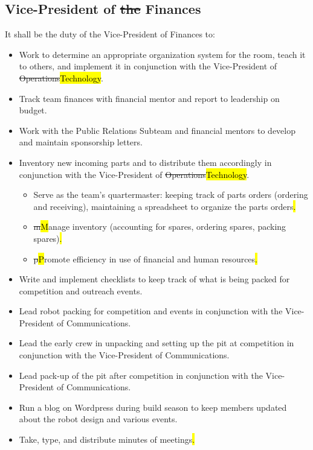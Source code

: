 \documentclass[12pt, a4paper]{article}
\begin{document}
\subsection{Vice-President of \st{the} Finances}
It shall be the duty of the Vice-President of Finances to:
\begin{itemize}
\item Work to determine an appropriate organization system for the room, teach it to others, and implement it in conjunction with the Vice-President of \st{Operations}\hl{Technology}.
\item Track team finances with financial mentor and report to leadership on budget.
\item Work with the Public Relations Subteam and financial mentors to develop and maintain sponsorship letters.  
\item Inventory new incoming parts and to distribute them accordingly in conjunction with the Vice-President of \st{Operations}\hl{Technology}.
	\begin{itemize}
	\item Serve as the team’s quartermaster: keeping track of parts orders (ordering and receiving), maintaining a spreadsheet to 	organize the parts orders\hl{.}
	\item \st{m}\hl{M}anage inventory (accounting for spares, ordering spares, packing spares)\hl{.}
	\item \st{p}\hl{P}romote efficiency in use of financial and human resources\hl{.}
\end{itemize}
\item Write and implement checklists to keep track of what is being packed for competition and outreach events.
\item Lead robot packing for competition and events in conjunction with the Vice-President of Communications.
\item Lead the early crew in unpacking and setting up the pit at competition in conjunction with the Vice-President of Communications.
\item Lead pack-up of the pit after competition in conjunction with the Vice-President of Communications.
\item Run a blog on Wordpress during build season to keep members updated about the robot design and various events.
\item Take, type, and distribute minutes of meetings\hl{.}
\end{itemize}
\end{document}
